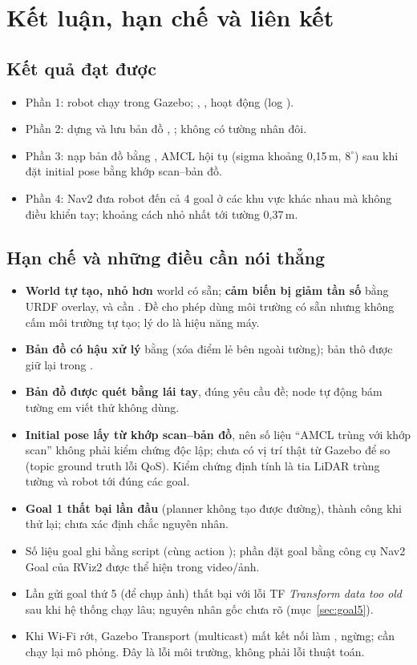 \section{Kết luận, hạn chế và liên kết}

\subsection{Kết quả đạt được}
\begin{itemize}
\item Phần 1: robot chạy trong Gazebo; , ,  hoạt động (log ).
\item Phần 2: dựng và lưu bản đồ , ; không có tường nhân đôi.
\item Phần 3: nạp bản đồ bằng , AMCL hội tụ (sigma khoảng 0,15\,m, $8^\circ$) sau khi đặt initial pose bằng khớp scan--bản đồ.
\item Phần 4: Nav2 đưa robot đến cả 4 goal ở các khu vực khác nhau mà không điều khiển tay; khoảng cách nhỏ nhất tới tường 0,37\,m.
\end{itemize}

\subsection{Hạn chế và những điều cần nói thẳng}
\begin{itemize}
\item \textbf{World tự tạo, nhỏ hơn} world  có sẵn; \textbf{cảm biến bị giảm tần số} bằng URDF overlay, và cần . Đề cho phép dùng môi trường có sẵn nhưng không cấm môi trường tự tạo; lý do là hiệu năng máy.
\item \textbf{Bản đồ có hậu xử lý} bằng  (xóa điểm lẻ bên ngoài tường); bản thô được giữ lại trong .
\item \textbf{Bản đồ được quét bằng lái tay}, đúng yêu cầu đề; node tự động bám tường em viết thử không dùng.
\item \textbf{Initial pose lấy từ khớp scan--bản đồ}, nên số liệu ``AMCL trùng với khớp scan'' không phải kiểm chứng độc lập; chưa có vị trí thật từ Gazebo để so (topic ground truth lỗi QoS). Kiểm chứng định tính là tia LiDAR trùng tường và robot tới đúng các goal.
\item \textbf{Goal 1 thất bại lần đầu} (planner không tạo được đường), thành công khi thử lại; chưa xác định chắc nguyên nhân.
\item Số liệu goal ghi bằng script  (cùng action ); phần đặt goal bằng công cụ Nav2 Goal của RViz2 được thể hiện trong video/ảnh.
\item Lần gửi goal thứ 5 (để chụp ảnh) thất bại với lỗi TF \emph{Transform data too old} sau khi hệ thống chạy lâu; nguyên nhân gốc chưa rõ (mục~\ref{sec:goal5}).
\item Khi Wi-Fi rớt, Gazebo Transport (multicast) mất kết nối làm ,  ngừng; cần chạy lại mô phỏng. Đây là lỗi môi trường, không phải lỗi thuật toán.
\end{itemize}

